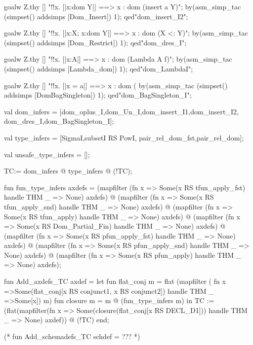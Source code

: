 \documentclass[a4paper,pdftex]{article}
\newenvironment{holz-proof}{\comment}{\endcomment}
\begin{document}
\begin{holz-proof}
goalw Z.thy [] "!!x. [|x:dom Y|] ==> x : dom (insert a Y)";
by(asm_simp_tac (simpset() addsimps [Dom_Insert]) 1);
qed"dom_insert_I2";

goalw Z.thy [] "!!x. [|x:X; x:dom Y|] ==> x : dom (X <: Y)";
by(asm_simp_tac (simpset() addsimps [Dom_Restrict]) 1);
qed"dom_dres_I";

goalw Z.thy [] "!!x. [|x:A|] ==> x : dom (Lambda A f)";
by(asm_simp_tac (simpset() addsimps [Lambda_dom]) 1);
qed"dom_LambdaI";

goalw Z.thy [] "!!x. [|x = a|] ==> x : dom (%
by(asm_simp_tac (simpset() addsimps [DomBagSingleton]) 1);
qed"dom_BagSingleton_I";


 
val dom_infers  = [dom_oplus_I,dom_Un_I,dom_insert_I1,dom_insert_I2,
                   dom_dres_I,dom_BagSingleton_I];


val type_infers = [SigmaI,subsetI RS PowI,
                   pair_rel_dom_fst,pair_rel_dom];

val unsafe_type_infers = [];

TC:= dom_infers @ type_infers @ (!TC);


fun fun_type_infers axdefs = 
    (mapfilter (fn x => Some(x RS tfun_apply_fst) handle THM _ => None) axdefs) @
    (mapfilter (fn x => Some(x RS tfun_apply_snd) handle THM _ => None) axdefs) @     
    (mapfilter (fn x => Some(x RS tfun_apply) handle THM _ => None) axdefs) @
    (mapfilter (fn x => Some(x RS Dom_Partial_Fin) handle THM _ => None) axdefs) @  
    (mapfilter (fn x => Some(x RS pfun_apply_fst) handle THM _ => None) axdefs) @  
    (mapfilter (fn x => Some(x RS pfun_apply_snd) handle THM _ => None) axdefs) @  
    (mapfilter (fn x => Some(x RS pfun_apply) handle THM _ => None) axdefs);
    



fun Add_axdefs_TC axdef =
    let fun flat_conj m = flat (mapfilter (
                                fn x            =>Some(flat_conj[x RS conjunct1,
                                                                 x RS conjunct2])
                                   handle THM _ =>Some[x]) m)
        fun closure m   = m @ (fun_type_infers m)
    in  TC := (flat(mapfilter(fn x => Some(closure(flat_conj[x RS DECL_D1]))
                              handle THM _ => None) 
                              axdef)) 
               @ (!TC)
    end;

(*
fun Add_schemadefs_TC schdef = ???
 *)






\end{holz-proof}
\end{document}
